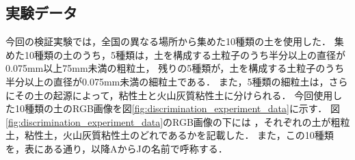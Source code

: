 \clearpage

\subsection{実験データ}
\label{ssec:DiscriminationExperimentalProcedure}

今回の検証実験では，全国の異なる場所から集めた10種類の土を使用した．
集めた10種類の土のうち，5種類は，土を構成する土粒子のうち半分以上の直径が0.075mm以上75mm未満の粗粒土，
残りの5種類が，土を構成する土粒子のうち半分以上の直径が0.075mm未満の細粒土である．
また，5種類の細粒土は，さらにその土の起源によって，粘性土と火山灰質粘性土に分けられる．
今回使用した10種類の土のRGB画像を図\ref{fig:discrimination_experiment_data}に示す．
図\ref{fig:discrimination_experiment_data}のRGB画像の下には
，それぞれの土が粗粒土，粘性土，火山灰質粘性土のどれであるかを記載した．
また，この10種類を，表にある通り，以降AからJの名前で呼称する．


